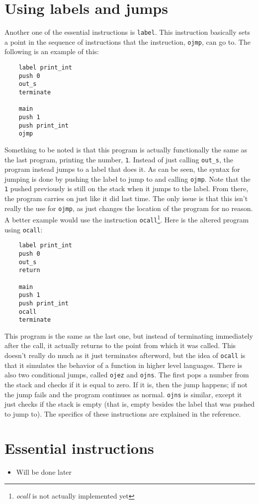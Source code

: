 \documentclass[12pt]{report}
\begin{document}
  \section{Using labels and jumps}
  Another one of the essential instructions is \verb|label|.  This instruction basically
  sets a point in the sequence of instructions that the instruction, \verb|ojmp|, can
  go to.  The following is an example of this:
  \begin{verbatim}
	label print_int
	push 0
	out_s
	terminate

	main
	push 1
	push print_int
	ojmp
  \end{verbatim}
  Something to be noted is that this program is actually functionally the same as the
  last program, printing the number, \verb|1|.  Instead of just calling \verb|out_s|,
  the program instead jumps to a label that does it.  As can be seen, the syntax for
  jumping is done by pushing the label to jump to and calling \verb|ojmp|.  Note
  that the \verb|1| pushed previously is still on the stack when it jumps to the label.
  From there, the program carries on just like it did last time.  The only issue is that
  this isn't really the use for \verb|ojmp|, as just changes the location of the program
  for no reason.  A better example would use the instruction \verb|ocall|\footnote{\emph{ocall} is not actually implemented yet}.  Here is the
  altered program using \verb|ocall|:
  \begin{verbatim}
	label print_int
	push 0
	out_s
	return

	main
	push 1
	push print_int
	ocall
	terminate
  \end{verbatim}
  This program is the same as the last one, but instead of terminating immediately after
  the call, it actually returns to the point from which it was called.  This doesn't
  really do much as it just terminates afterword, but the idea of \verb|ocall| is that
  it simulates the behavior of a function in higher level languages.  There is also two
  conditional jumps, called \verb|ojez| and \verb|ojns|.  The first pops a number from
  the stack and checks if it is equal to zero.  If it is, then the jump happens; if not
  the jump fails and the program continues as normal.  \verb|ojns| is similar, except it
  just checks if the stack is empty (that is, empty besides the label that was pushed
  to jump to).  The specifics of these instructions are explained in the reference.
  \section{Essential instructions}
  \begin{itemize}
  \item Will be done later
  \end{itemize}
\end{document}
